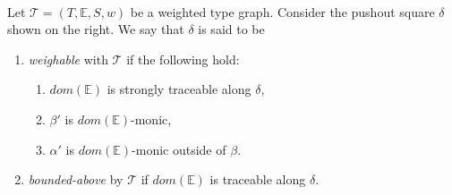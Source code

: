 \begin{definition}
    \label{def:weighable}
    \ \newline
    \noindent
    \begin{minipage}{0.7\textwidth}
        Let  $\mathcal{T} = (T,\mathbb{E}, S, w)$ be a weighted type graph.
        Consider the pushout square $\delta$ shown on the right. We say that $\delta$ is said to be
         \begin{enumerate}[label=(\alph*)]
        \item \emph{weighable} with $\mathcal{T}$ if the following hold:
            \begin{enumerate}[label=(\roman*)]
                \item $dom(\mathbb{E})$ is strongly traceable along $\delta$,
                \item $\beta'$ is $dom(\mathbb{E})$-monic,
                \item $\alpha'$ is $dom(\mathbb{E})$-monic outside of $\beta$.
            \end{enumerate}
        \item \emph{bounded-above} by $\mathcal{T}$ if $dom(\mathbb{E})$ is traceable along $\delta$.
    \end{enumerate}
    \end{minipage}
    \begin{minipage}{0.3\textwidth}
        \begin{center}
        \end{center}
    \end{minipage}
   
\end{definition}

